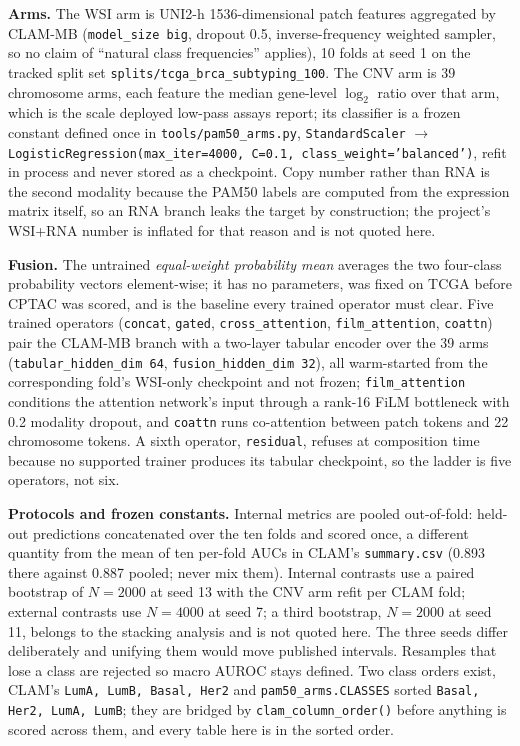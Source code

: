 \documentclass[10pt,a4paper]{article}
\begin{document}
\textbf{Arms.} The WSI arm is UNI2-h 1536-dimensional patch features aggregated by CLAM-MB
(\texttt{model\_size big}, dropout 0.5, inverse-frequency weighted sampler, so no claim of
``natural class frequencies'' applies), 10 folds at seed 1 on the tracked split set
\texttt{splits/tcga\_brca\_subtyping\_100}. The CNV arm is 39 chromosome arms, each feature the
median gene-level $\log_2$ ratio over that arm, which is the scale deployed low-pass assays
report; its classifier is a frozen constant defined once in \texttt{tools/pam50\_arms.py},
\texttt{StandardScaler} $\rightarrow$
\texttt{LogisticRegression(max\_iter=4000, C=0.1, class\_weight='balanced')}, refit in process and
never stored as a checkpoint. Copy number rather than RNA is the second modality because the PAM50
labels are computed from the expression matrix itself, so an RNA branch leaks the target by
construction; the project's WSI+RNA number is inflated for that reason and is not quoted here.

\textbf{Fusion.} The untrained \emph{equal-weight probability mean} averages the two four-class
probability vectors element-wise; it has no parameters, was fixed on TCGA before CPTAC was scored,
and is the baseline every trained operator must clear. Five trained operators (\texttt{concat},
\texttt{gated}, \texttt{cross\_attention}, \texttt{film\_attention}, \texttt{coattn}) pair the
CLAM-MB branch with a two-layer tabular encoder over the 39 arms
(\texttt{tabular\_hidden\_dim 64}, \texttt{fusion\_hidden\_dim 32}), all warm-started from the
corresponding fold's WSI-only checkpoint and not frozen; \texttt{film\_attention} conditions the
attention network's input through a rank-16 FiLM bottleneck with 0.2 modality dropout, and
\texttt{coattn} runs co-attention between patch tokens and 22 chromosome tokens. A sixth operator,
\texttt{residual}, refuses at composition time because no supported trainer produces its tabular
checkpoint, so the ladder is five operators, not six.

\textbf{Protocols and frozen constants.} Internal metrics are pooled out-of-fold: held-out
predictions concatenated over the ten folds and scored once, a different quantity from the mean of
ten per-fold AUCs in CLAM's \texttt{summary.csv} (0.893 there against 0.887 pooled; never mix
them). Internal contrasts use a paired bootstrap of $N=2000$ at seed 13 with the CNV arm refit per
CLAM fold; external contrasts use $N=4000$ at seed 7; a third bootstrap, $N=2000$ at seed 11,
belongs to the stacking analysis and is not quoted here. The three seeds differ deliberately and
unifying them would move published intervals. Resamples that lose a class are rejected so macro
AUROC stays defined. Two class orders exist, CLAM's \texttt{LumA, LumB, Basal, Her2} and
\texttt{pam50\_arms.CLASSES} sorted \texttt{Basal, Her2, LumA, LumB}; they are bridged by
\texttt{clam\_column\_order()} before anything is scored across them, and every table here is in
the sorted order.
\end{document}
